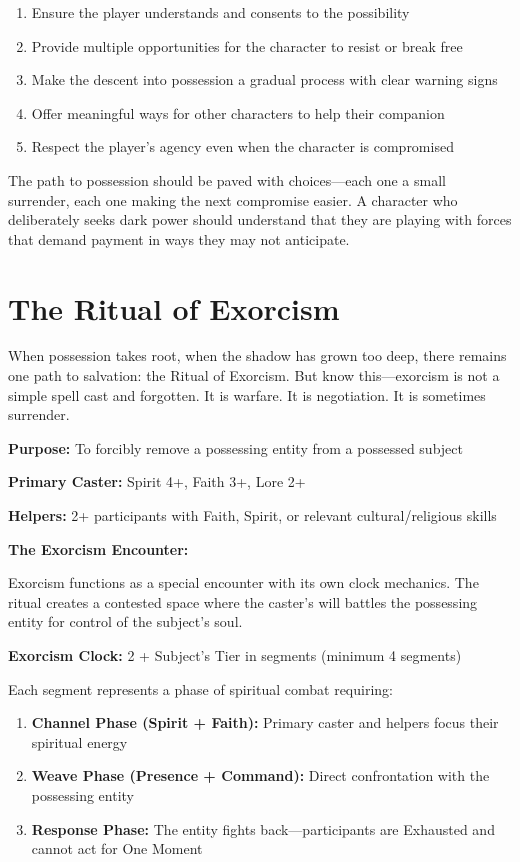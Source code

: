 \documentclass[12pt,twoside]{book}
\begin{document}
\begin{enumerate}
\item Ensure the player understands and consents to the possibility
\item Provide multiple opportunities for the character to resist or break free
\item Make the descent into possession a gradual process with clear warning signs
\item Offer meaningful ways for other characters to help their companion
\item Respect the player's agency even when the character is compromised
\end{enumerate}

The path to possession should be paved with choices—each one a small surrender, each one making the next compromise easier. A character who deliberately seeks dark power should understand that they are playing with forces that demand payment in ways they may not anticipate.

\section*{The Ritual of Exorcism}

When possession takes root, when the shadow has grown too deep, there remains one path to salvation: the Ritual of Exorcism. But know this—exorcism is not a simple spell cast and forgotten. It is warfare. It is negotiation. It is sometimes surrender.

\textbf{Purpose:} To forcibly remove a possessing entity from a possessed subject

\textbf{Primary Caster:} Spirit 4+, Faith 3+, Lore 2+

\textbf{Helpers:} 2+ participants with Faith, Spirit, or relevant cultural/religious skills

\textbf{The Exorcism Encounter:}

Exorcism functions as a special encounter with its own clock mechanics. The ritual creates a contested space where the caster's will battles the possessing entity for control of the subject's soul.

\textbf{Exorcism Clock:} 2 + Subject's Tier in segments (minimum 4 segments)

Each segment represents a phase of spiritual combat requiring:
\begin{enumerate}
\item \textbf{Channel Phase (Spirit + Faith):} Primary caster and helpers focus their spiritual energy
\item \textbf{Weave Phase (Presence + Command):} Direct confrontation with the possessing entity
\item \textbf{Response Phase:} The entity fights back—participants are Exhausted and cannot act for One Moment
\end{enumerate}
\end{document}
